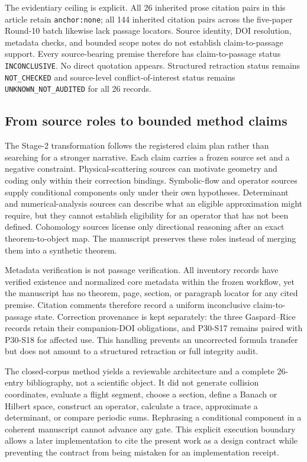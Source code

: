 \documentclass[11pt,a4paper]{article}
\begin{document}
The evidentiary ceiling is explicit. All 26 inherited prose citation pairs in this article retain \texttt{anchor:\allowbreak none}; all 144 inherited citation pairs across the five-paper Round-10 batch likewise lack passage locators. Source identity, DOI resolution, metadata checks, and bounded scope notes do not establish claim-to-passage support. Every source-bearing premise therefore has claim-to-passage status \texttt{INCONCLUSIVE}. No direct quotation appears. Structured retraction status remains \texttt{NOT\_CHECKED} and source-level conflict-of-interest status remains \texttt{UNKNOWN\_NOT\_AUDITED} for all 26 records.

\subsection{From source roles to bounded method claims}

The Stage-2 transformation follows the registered claim plan rather than searching for a stronger narrative. Each claim carries a frozen source set and a negative constraint. Physical-scattering sources can motivate geometry and coding only within their correction bindings. Symbolic-flow and operator sources supply conditional components only under their own hypotheses. Determinant and numerical-analysis sources can describe what an eligible approximation might require, but they cannot establish eligibility for an operator that has not been defined. Cohomology sources license only directional reasoning after an exact theorem-to-object map. The manuscript preserves these roles instead of merging them into a synthetic theorem.

Metadata verification is not passage verification. All inventory records have verified existence and normalized core metadata within the frozen workflow, yet the manuscript has no theorem, page, section, or paragraph locator for any cited premise. Citation comments therefore record a uniform inconclusive claim-to-passage state. Correction provenance is kept separately: the three Gaspard--Rice records retain their companion-DOI obligations, and P30-S17 remains paired with P30-S18 for affected use. This handling prevents an uncorrected formula transfer but does not amount to a structured retraction or full integrity audit.

The closed-corpus method yields a reviewable architecture and a complete 26-entry bibliography, not a scientific object. It did not generate collision coordinates, evaluate a flight segment, choose a section, define a Banach or Hilbert space, construct an operator, calculate a trace, approximate a determinant, or compare periodic sums. Rephrasing a conditional component in a coherent manuscript cannot advance any gate. This explicit execution boundary allows a later implementation to cite the present work as a design contract while preventing the contract from being mistaken for an implementation receipt.
\end{document}
